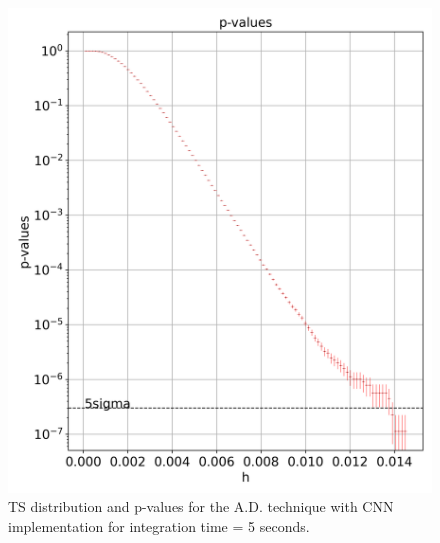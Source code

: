 \begin{figure}[!htb]
\begin{minipage}{0.5\textwidth}
       \includegraphics[width=\linewidth]{figures/experiments/p_val/model_0/pvalue_bins_100.png}
    \end{minipage}
    \caption{TS distribution and p-values for the A.D. technique with CNN implementation for integration time = 5 seconds.}
    \label{fig:ts-distribution-and-p-values-cnn-it-5}
\end{figure}


